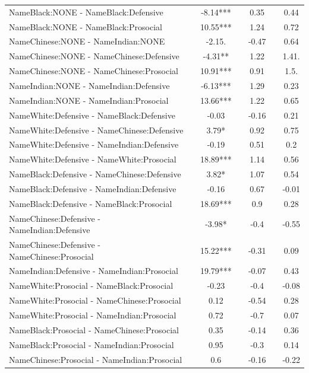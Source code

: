\documentclass[]{report}
\begin{document}
\begin{table}
{\begin{tabular}[t]{lcccccc}
	NameBlack:NONE - NameBlack:Defensive &  & -8.14*** &  & 0.35 &  & 0.44 \\ 
	NameBlack:NONE - NameBlack:Prosocial &  & 10.55*** &  & 1.24 &  & 0.72 \\ 
	NameChinese:NONE - NameIndian:NONE &  & -2.15. &  & -0.47 &  & 0.64 \\ 
	NameChinese:NONE - NameChinese:Defensive &  & -4.31** &  & 1.22 &  & 1.41. \\ 
	NameChinese:NONE - NameChinese:Prosocial &  & 10.91*** &  & 0.91 &  & 1.5. \\ 
	NameIndian:NONE - NameIndian:Defensive &  & -6.13*** &  & 1.29 &  & 0.23 \\ 
	NameIndian:NONE - NameIndian:Prosocial &  & 13.66*** &  & 1.22 &  & 0.65 \\ 
	NameWhite:Defensive - NameBlack:Defensive &  & -0.03 &  & -0.16 &  & 0.21 \\ 
	NameWhite:Defensive - NameChinese:Defensive &  & 3.79* &  & 0.92 &  & 0.75 \\ 
	NameWhite:Defensive - NameIndian:Defensive &  & -0.19 &  & 0.51 &  & 0.2 \\ 
	NameWhite:Defensive - NameWhite:Prosocial &  & 18.89*** &  & 1.14 &  & 0.56 \\ 
	NameBlack:Defensive - NameChinese:Defensive &  & 3.82* &  & 1.07 &  & 0.54 \\ 
	NameBlack:Defensive - NameIndian:Defensive &  & -0.16 &  & 0.67 &  & -0.01 \\ 
	NameBlack:Defensive - NameBlack:Prosocial &  & 18.69*** &  & 0.9 &  & 0.28 \\ 
	NameChinese:Defensive - NameIndian:Defensive &  & -3.98* &  & -0.4 &  & -0.55 \\ 
	NameChinese:Defensive - NameChinese:Prosocial &  & 15.22*** &  & -0.31 &  & 0.09 \\ 
	NameIndian:Defensive - NameIndian:Prosocial &  & 19.79*** &  & -0.07 &  & 0.43 \\ 
	NameWhite:Prosocial - NameBlack:Prosocial &  & -0.23 &  & -0.4 &  & -0.08 \\ 
	NameWhite:Prosocial - NameChinese:Prosocial &  & 0.12 &  & -0.54 &  & 0.28 \\ 
	NameWhite:Prosocial - NameIndian:Prosocial &  & 0.72 &  & -0.7 &  & 0.07 \\ 
	NameBlack:Prosocial - NameChinese:Prosocial &  & 0.35 &  & -0.14 &  & 0.36 \\ 
	NameBlack:Prosocial - NameIndian:Prosocial &  & 0.95 &  & -0.3 &  & 0.14 \\ 
	NameChinese:Prosocial - NameIndian:Prosocial &  & 0.6 &  & -0.16 &  & -0.22 \\ 
	\hline
	\end{tabular}}
\end{table}
\end{document}
